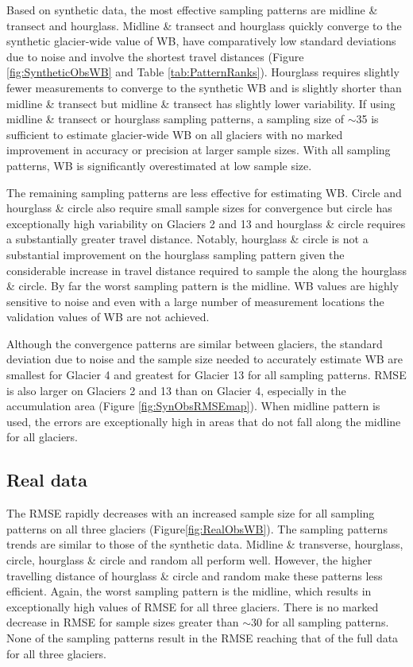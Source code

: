 \documentclass[twocolumn,letterpaper]{igs}
\begin{document}
Based on synthetic data, the most effective sampling patterns are midline \& transect and hourglass. Midline \& transect and hourglass quickly converge to the synthetic glacier-wide value of WB, have comparatively low standard deviations due to noise and involve the shortest travel distances (Figure \ref{fig:SyntheticObsWB} and Table \ref{tab:PatternRanks}). Hourglass requires slightly fewer measurements to converge to the synthetic WB and is slightly shorter than midline \& transect but midline \& transect has slightly lower variability. If using midline \& transect or hourglass sampling patterns, a sampling size of $\sim$35 is sufficient to estimate glacier-wide WB on all glaciers with no marked improvement in accuracy or precision at larger sample sizes. With all sampling patterns, WB is significantly overestimated at low sample size.

The remaining sampling patterns are less effective for estimating WB. Circle and hourglass \& circle also require small sample sizes for convergence but circle has exceptionally high variability on Glaciers 2 and 13 and hourglass \& circle requires a substantially greater travel distance. Notably, hourglass \& circle is not a substantial improvement on the hourglass sampling pattern given the considerable increase in travel distance required to sample the along the hourglass \& circle. By far the worst sampling pattern is the midline. WB values are highly sensitive to noise and even with a large number of measurement locations the validation values of WB are not achieved.

Although the convergence patterns are similar between glaciers, the standard deviation due to noise and the sample size needed to accurately estimate WB are smallest for Glacier 4 and greatest for Glacier 13 for all sampling patterns. RMSE is also larger on Glaciers 2 and 13 than on Glacier 4, especially in the accumulation area (Figure \ref{fig:SynObsRMSEmap}). When midline pattern is used, the errors are exceptionally high in areas that do not fall along the midline for all glaciers.


\subsection{Real data}

The RMSE rapidly decreases with an increased sample size for all sampling patterns on all three glaciers (Figure\ref{fig:RealObsWB}). The sampling patterns trends are similar to those of the synthetic data. Midline \& transverse, hourglass, circle, hourglass \& circle and random all perform well. However, the higher travelling distance of hourglass \& circle and random make these patterns less efficient.  Again, the worst sampling pattern is the midline, which results in exceptionally high values of RMSE for all three glaciers. There is no marked decrease in RMSE for sample sizes greater than $\sim30$ for all sampling patterns. None of the sampling patterns result in the RMSE reaching that of the full data for all three glaciers. 
\end{document}
